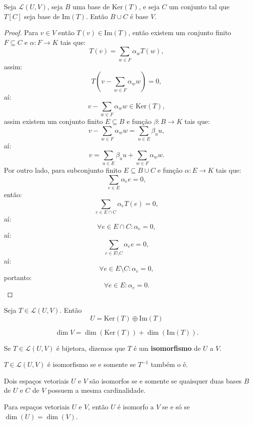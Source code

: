 \documentclass[11pt,twoside,a4paper]{book}
\begin{document}
\begin{teorema}
Seja $\mathcal{L}(U,V)$, seja $B$ uma base de $\mathrm{Ker}(T)$, e seja $C$ um conjunto tal que $T[C]$ seja base de $\mathrm{Im}(T)$. Então $B\cup C$ é base $V$.
\end{teorema}
\begin{proof}
Para $v\in V$ então $T(v)\in\mathrm{Im}(T)$, então existem um conjunto finito $F\subseteq C$ e $\alpha:F\rightarrow K$ tais que:
\[
T(v)=\sum\limits_{w\in F}\alpha_wT(w),
\]
assim:
\[
T\left(v-\sum\limits_{w\in F}\alpha_ww\right)=0,
\]
aí:
\[
v-\sum\limits_{w\in F}\alpha_ww\in\mathrm{Ker}(T),
\]
assim existem um conjunto finito $E\subseteq B$ e função $\beta:B\rightarrow K$ tais que:
\[
v-\sum\limits_{w\in F}\alpha_ww=\sum\limits_{u\in E}\beta_uu,
\]
aí:
\[
v=\sum\limits_{u\in E}\beta_uu+\sum\limits_{w\in F}\alpha_ww.
\]
Por outro lado, para subconjunto finito $E\subseteq B\cup C$ e função $\alpha:E\rightarrow K$ tais que:
\[
\sum_{e\in E}\alpha_ee=0,
\]
então:
\[
\sum_{e\in E\cap C}\alpha_eT(e)=0,
\]
aí:
\[
\forall e\in E\cap C:\alpha_e=0,
\]
aí:
\[
\sum_{e\in E\setminus C}\alpha_ee=0,
\]
aí:
\[
\forall e\in E\setminus C:\alpha_e=0,
\]
portanto:
\[
\forall e\in E:\alpha_e=0.
\]
\end{proof}

\begin{teorema} 
Seja $T \in \mathcal{L}(U,V).$ Então
\[
U = \mathrm{Ker}(T) \oplus \mathrm{Im}(T)
\]

\end{teorema}
\begin{corolario}
\[
\dim V=\dim(\mathrm{Ker}(T))+\dim(\mathrm{Im}(T)).
\]
\end{corolario}

\begin{definicao}
Se $T\in\mathcal{L}(U,V)$ é bijetora, dizemos que $T$ é um \textbf{isomorfismo} de $U$ a $V$.
\end{definicao}
\begin{proposicao}
$T \in \mathcal{L}(U,V)$ é isomorfismo se e somente se $T^{-1}$ também o é.
\end{proposicao}

\begin{proposicao}
Dois espaços vetoriais $U$ e $V$ são isomorfos se e somente se quaisquer duas bases $B$ de $U$ e $C$ de $V$ possuem a mesma cardinalidade.
\end{proposicao}
\begin{teorema}
Para espaços vetoriais $U$ e $V$, então $U$ é isomorfo a $V$ se e só se $\dim(U)=\dim(V)$.
\end{teorema}
\end{document}
